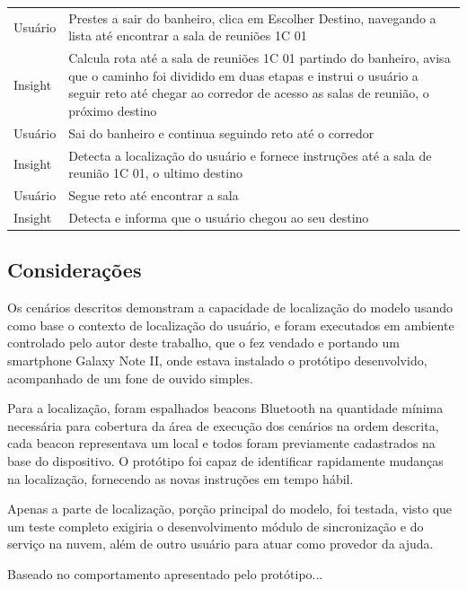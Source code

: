 \documentclass[twoside,english,brazilian]{UNISINOSartigo}
\begin{document}
\begin{table}
\begin{minipage}{1\textwidth}
\begin{adjustbox}{max width=\textwidth}
\begin{tabular}{ p{} | p{14cm} }
Usuário & Prestes a sair do banheiro, clica em Escolher Destino, navegando a lista até encontrar a sala de reuniões 1C 01 \\
Insight & Calcula rota até a sala de reuniões 1C 01 partindo do banheiro, avisa que o caminho foi dividido em duas etapas e instrui o usuário a seguir reto até chegar ao corredor de acesso as salas de reunião, o próximo destino \\
Usuário & Sai do banheiro e continua seguindo reto até o corredor \\
Insight & Detecta a localização do usuário e fornece instruções até a sala de reunião 1C 01, o ultimo destino \\
Usuário & Segue reto até encontrar a sala \\
Insight & Detecta e informa que o usuário chegou ao seu destino \\
\hline
			\end{tabular}
		\end{adjustbox}
	\end{minipage}
\end{table}

\subsection{Considerações}
Os cenários descritos demonstram a capacidade de localização do modelo usando como base o contexto de localização do usuário, e foram executados em ambiente controlado pelo autor deste trabalho, que o fez vendado e portando um smartphone Galaxy Note II, onde estava instalado o protótipo desenvolvido, acompanhado de um fone de ouvido simples. 

Para a localização, foram espalhados beacons Bluetooth na quantidade mínima necessária para cobertura da área de execução dos cenários na ordem descrita, cada beacon representava um local e todos foram previamente cadastrados na base do dispositivo. O protótipo foi capaz de identificar rapidamente mudanças na localização, fornecendo as novas instruções em tempo hábil.

Apenas a parte de localização, porção principal do modelo, foi testada, visto que um teste completo exigiria o desenvolvimento módulo de sincronização e do serviço na nuvem, além de outro usuário para atuar como provedor da ajuda.

Baseado no comportamento apresentado pelo protótipo... %
\end{document}
